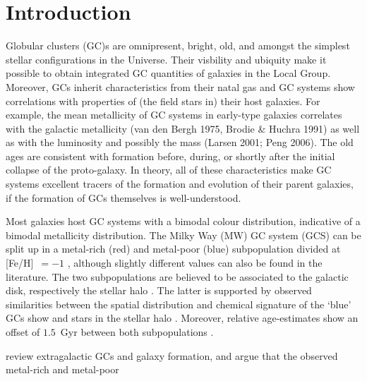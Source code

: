\documentclass[a4paper,fleqn,usenatbib]{mnras}
\begin{document}
\section{Introduction}
Globular clusters (GC)s are omnipresent, bright, old, and amongst the simplest
stellar configurations in the Universe. Their visbility and ubiquity make it 
possible to obtain integrated GC quantities of galaxies in the Local Group. 
Moreover, GCs inherit characteristics from their natal gas and GC systems show 
correlations with properties of (the field stars in) their host galaxies. For 
example, the mean metallicity of GC systems in early-type galaxies correlates with 
the galactic metallicity (van den Bergh 1975, Brodie \& Huchra 1991) as well as 
with the luminosity and possibly the mass (Larsen 2001; Peng 2006). The old ages
are consistent with formation before, during, or shortly after the initial
collapse of the proto-galaxy. In theory, all of these characteristics make GC
systems excellent tracers of the formation and evolution of their parent galaxies,
if the formation of GCs themselves is well-understood.

Most galaxies host GC systems with a bimodal colour distribution, indicative of
a bimodal metallicity distribution. The Milky Way (MW) GC system (GCS) can be
split up in a metal-rich (red) and metal-poor (blue) subpopulation divided at
[Fe/H]~$=-1$ \citep[e.g.][]{Harris2001}, although slightly different values can
also be found in the literature. The two subpopulations are believed to be
associated to the galactic disk, respectively the stellar halo 
\citep{1985ApJ...293..424Z}. The latter is supported by observed similarities 
between the spatial distribution and chemical signature of the `blue' GCs show 
and stars in the stellar halo \citep{2008A&ARv..15..145H}. Moreover, relative 
age-estimates show an offset of $1.5$~Gyr between both subpopulations 
\citep{2005AJ....130..116D}.

\citet{2006ARA&A..44..193B} review extragalactic GCs and galaxy 
formation, and argue that the observed metal-rich and metal-poor 


% 
% 
\end{document}
